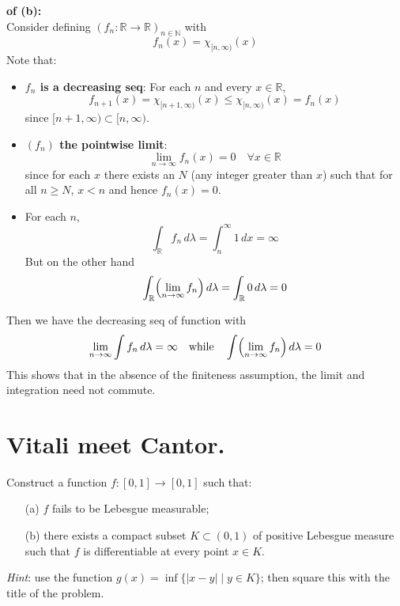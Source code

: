 \documentclass[lang=cn,11pt]{elegantbook}
\begin{document}
\begin{solution}
    \textbf{of (b):}\\
 Consider defining $(f_n: \mathbb{R} \rightarrow \mathbb{ R})_{n\in\mathbb{N}}$ with
\[
f_n(x) = \chi_{[n,\infty)}(x)
\]
Note that: \begin{itemize}
    \item  \textbf{$f_n$ is a decreasing seq}: For each \(n\) and every \(x\in\mathbb{R}\),\[
   f_{n+1}(x) = \chi_{[n+1,\infty)}(x) \le \chi_{[n,\infty)}(x) = f_n(x)
   \]
since \([n+1,\infty) \subset [n,\infty)\).
\item \textbf{$(f_n)$ the pointwise limit}:\[
   \lim_{n\to\infty} f_n(x) = 0 \quad \forall x\in\mathbb{R}
   \]since for each $x$ there exists an \(N\) (any integer greater than \(x\)) such that for all \(n \ge N\), \(x < n\) and hence \(f_n(x)=0\).
   \item For each $n$, \[
     \int_{\mathbb{R}} f_n\,d\lambda = \int_n^\infty 1\,dx = \infty
     \]
   But on the other hand
     \[
     \int_{\mathbb{R}} \Bigl(\lim_{n\to\infty} f_n\Bigr)\,d\lambda = \int_{\mathbb{R}} 0\,d\lambda = 0
     \]

\end{itemize}
Then we have the decreasing seq of function with
\[
\lim_{n\to\infty} \int f_n\,d\lambda = \infty \quad \text{while} \quad \int \Bigl(\lim_{n\to\infty} f_n\Bigr)\,d\lambda = 0
\]
This shows that in the absence of the finiteness assumption, the limit and integration need not commute.
\end{solution}





\section{Vitali meet Cantor.} 
  Construct a function $f\colon[0,1]\to[0,1]$ such that:
  \begin{itemize}
  \item[(a)] $f$ fails to be Lebesgue measurable;
  \item[(b)]there exists a compact subset $K\subset(0,1)$ of positive Lebesgue measure such that $f$ is differentiable at every point $x\in K$.
  \end{itemize}
  \textit{Hint}: use the function $g(x)=\inf\{|x-y|\mid y\in K\}$; then square this with the title of the problem.
\end{document}
